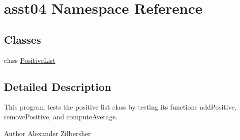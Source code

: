 \hypertarget{namespaceasst04}{}\section{asst04 Namespace Reference}
\label{namespaceasst04}
\subsection*{Classes}
\begin{DoxyCompactItemize}
\item 
class \hyperlink{classasst04_1_1_positive_list}{Positive\+List}
\end{DoxyCompactItemize}


\subsection{Detailed Description}
This program tests the positive list class by testing its functions add\+Positive, remove\+Positive, and compute\+Average.

\begin{DoxyAuthor}{Author}
Alexander Zilbersher 
\end{DoxyAuthor}
